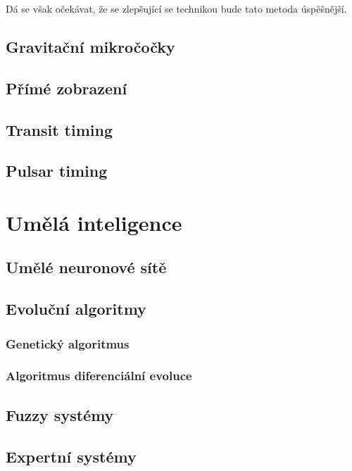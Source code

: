 \documentclass[a4paper,12pt]{article}
\begin{document}
{
\drawgimp

Dá se však očekávat, že se zlepšující se technikou bude tato metoda úspěšnější.

\subsection{Gravitační mikročočky}
\subsection{Přímé zobrazení}
\subsection{Transit timing}
\subsection{Pulsar timing}

\section{Umělá inteligence}

\subsection{Umělé neuronové sítě}

\subsection{Evoluční algoritmy}

\subsubsection{Genetický algoritmus}

\subsubsection{Algoritmus diferenciální evoluce}

\subsection{Fuzzy systémy}

\subsection{Expertní systémy}

}
\end{document}
